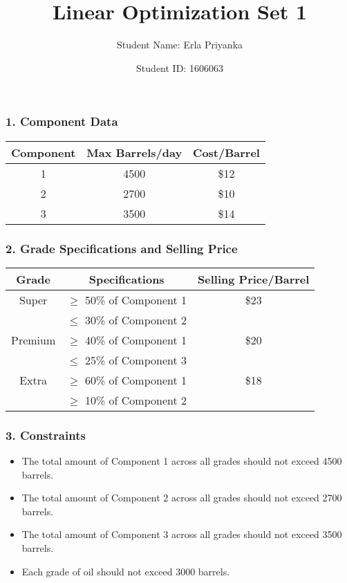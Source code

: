 \documentclass[12pt]{article}
\title{Linear Optimization Set 1}
\author{Student Name: Erla Priyanka}
\date{Student ID: 1606063}
\begin{document}
\maketitle


\subsubsection*{1. Component Data}
\begin{tabular}{|c|c|c|}
\hline
\textbf{Component} & \textbf{Max Barrels/day} & \textbf{Cost/Barrel} \\
\hline
1 & 4500 & \$12 \\
2 & 2700 & \$10 \\
3 & 3500 & \$14 \\
\hline
\end{tabular}

\subsubsection*{2. Grade Specifications and Selling Price}
\begin{tabular}{|c|c|c|}
\hline
\textbf{Grade} & \textbf{Specifications} & \textbf{Selling Price/Barrel} \\
\hline
Super & $\geq$ 50\% of Component 1 & \$23 \\
 & $\leq$ 30\% of Component 2 & \\
Premium & $\geq$ 40\% of Component 1 & \$20 \\
 & $\leq$ 25\% of Component 3 & \\
Extra & $\geq$ 60\% of Component 1 & \$18 \\
 & $\geq$ 10\% of Component 2 & \\
\hline
\end{tabular}

\subsubsection*{3. Constraints}
\begin{itemize}
    \item The total amount of Component 1 across all grades should not exceed 4500 barrels.
    \item The total amount of Component 2 across all grades should not exceed 2700 barrels.
    \item The total amount of Component 3 across all grades should not exceed 3500 barrels.
    \item Each grade of oil should not exceed 3000 barrels.
\end{itemize}
\end{document}
